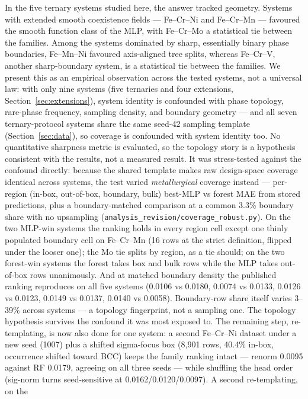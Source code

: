 \documentclass[preprint,12pt,authoryear]{elsarticle}
\begin{document}
In the five ternary systems studied here, the answer tracked geometry. Systems with
extended smooth coexistence fields --- Fe--Cr--Ni and Fe--Cr--Mn --- favoured
the smooth function class of the MLP, with Fe--Cr--Mo a statistical tie
between the families. Among the systems dominated by sharp, essentially
binary phase boundaries, Fe--Mn--Ni favoured axis-aligned tree splits,
whereas Fe--Cr--V, another sharp-boundary system, is a statistical tie
between the families. We present
this as an empirical observation across the tested systems, not a universal
law: with only nine systems (five ternaries and four extensions,
Section~\ref{sec:extensions}), system identity is confounded with phase
topology, rare-phase frequency, sampling density, and boundary geometry ---
and all seven ternary-protocol systems share the same seed-42 sampling template
(Section~\ref{sec:data}), so coverage is confounded with system
identity too. No quantitative sharpness metric is evaluated, so the
topology story is a hypothesis consistent with the results, not a measured
result. It was stress-tested against the confound directly: because the
shared template makes raw design-space coverage identical across systems,
the test varied \emph{metallurgical} coverage instead --- per-region
(in-box, out-of-box, boundary, bulk) best-MLP vs forest MAE from stored
predictions, plus a boundary-matched comparison at a common 3.3\%
boundary share with no upsampling
(\texttt{analysis\_revision/coverage\_robust.py}).
On the two MLP-win systems the ranking holds in every region cell except
one thinly populated boundary cell on Fe--Cr--Mn (16 rows at the strict
definition, flipped under the looser one); the Mo tie splits by region,
as a tie should; on the two forest-win systems the forest takes box and
bulk rows while the MLP takes out-of-box rows unanimously. And at
matched boundary density the published ranking reproduces on all five
systems (0.0106 vs 0.0180, 0.0074 vs 0.0133, 0.0126 vs 0.0123, 0.0149
vs 0.0137, 0.0140 vs 0.0058). Boundary-row share itself varies 3--39\%
across systems --- a topology fingerprint, not a sampling one. The
topology hypothesis survives the confound it was most exposed to. The
remaining step, re-templating, is now also done for one system: a second
Fe--Cr--Ni dataset under a new seed (1007) plus a shifted sigma-focus
box (8{,}901 rows, 40.4\% in-box, occurrence shifted toward BCC) keeps
the family ranking intact --- renorm 0.0095 against RF 0.0179, agreeing
on all three seeds --- while shuffling the head order (sig-norm turns
seed-sensitive at 0.0162/0.0120/0.0097). A second re-templating, on the
\end{document}
